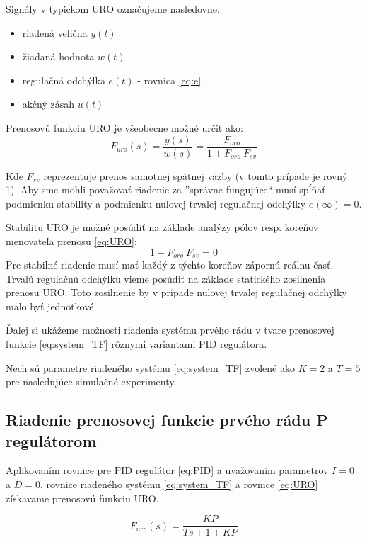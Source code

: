\documentclass[a4paper,10pt]{article}
\begin{document}
Signály v typickom URO označujeme nasledovne:
\begin{itemize}
\item riadená velična $y(t)$
\item žiadaná hodnota  $w(t)$
\item regulačná odchýlka $e(t)$ - rovnica \eqref{eq:e}
\item akčný zásah $u(t)$
\end{itemize}

Prenosovú funkciu URO je všeobecne možné určiť ako:
\begin{equation}
 \label{eq:URO}
 F_{uro}(s)=\frac{y(s)}{w(s)}=\frac{F_{oro}}{1+F_{oro}\:F_{sv}}
\end{equation}

Kde $F_{sv}$ reprezentuje prenos samotnej spätnej väzby (v tomto prípade je rovný 1).
Aby sme mohli považovať riadenie za ''správne fungujúce`` musí spĺňať podmienku stability a podmienku nulovej trvalej regulačnej odchýlky $e(\infty)=0$. 

Stabilitu URO je možné posúdiť na základe analýzy pólov resp. koreňov menovateľa prenosu \eqref{eq:URO}:
\begin{equation}
 \label{eq:URO_stability}
 	 1+F_{oro}\:F_{sv}=0
\end{equation}
Pre stabilné riadenie musí mať každý z týchto koreňov zápornú reálnu časť.
Trvalú regulačnú odchýlku vieme posúdiť na základe statického zosilnenia prenosu URO. Toto zosilnenie by v prípade nulovej trvalej regulačnej odchýlky malo byť jednotkové.

Ďalej si ukážeme možnosti riadenia systému prvého rádu v tvare prenosovej funkcie \eqref{eq:system_TF} rôznymi variantami PID regulátora.

Nech sú parametre riadeného systému \eqref{eq:system_TF} zvolené ako $K=2$ a $T=5$ pre nasledujúce simulačné experimenty.

\pagebreak

\subsection{Riadenie prenosovej funkcie prvého rádu P regulátorom}

Aplikovaním rovnice pre PID regulátor \eqref{eq:PID} a uvažovaním parametrov $I=0$ a $D=0$, rovnice riadeného systému \eqref{eq:system_TF} a rovnice \eqref{eq:URO} získavame prenosovú funkciu URO.

\begin{equation}
\label{eq:URO_P}
 F_{uro}(s)=\frac{KP}{Ts+1+KP}
\end{equation}
\end{document}
